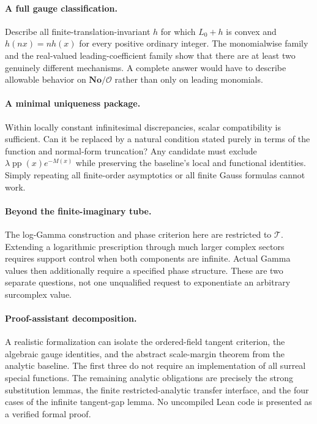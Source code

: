 \documentclass[11pt,letterpaper]{article}
\numberwithin{equation}{section}
\theoremstyle{plain}
\theoremstyle{definition}
\theoremstyle{remark}
\newcommand{\No}{\mathbf{No}}
\newcommand{\Ocal}{\mathcal O}
\newcommand{\pp}{\operatorname{pp}}
\newcommand{\tube}{\mathcal T}
\begin{document}
\paragraph{A full gauge classification.}
Describe all finite-translation-invariant $h$ for which $L_0+h$ is convex
and $h(nx)=nh(x)$ for every positive ordinary integer. The monomialwise
family and the real-valued leading-coefficient family show that there are
at least two genuinely different mechanisms. A complete answer would have
to describe allowable behavior on $\No/\Ocal$ rather than only on leading
monomials.

\paragraph{A minimal uniqueness package.}
Within locally constant infinitesimal discrepancies, scalar compatibility
is sufficient. Can it be replaced by a natural condition stated purely in
terms of the function and normal-form truncation? Any candidate must exclude
$\lambda\pp(x)e^{-M(x)}$ while preserving the baseline's local and
functional identities. Simply repeating all finite-order asymptotics or
all finite Gauss formulas cannot work.

\paragraph{Beyond the finite-imaginary tube.}
The log-Gamma construction and phase criterion here are restricted to
$\tube$. Extending a logarithmic prescription through much larger complex
sectors requires support control when both components are infinite. Actual
Gamma values then additionally require a specified phase structure. These
are two separate questions, not one unqualified request to exponentiate
an arbitrary surcomplex value.

\paragraph{Proof-assistant decomposition.}
A realistic formalization can isolate the ordered-field tangent criterion,
the algebraic gauge identities, and the abstract scale-margin theorem from
the analytic baseline. The first three do not require an implementation of
all surreal special functions. The remaining analytic obligations are
precisely the strong substitution lemmas, the finite restricted-analytic
transfer interface, and the four cases of the infinite tangent-gap lemma.
No uncompiled Lean code is presented as a verified formal proof.
\end{document}
